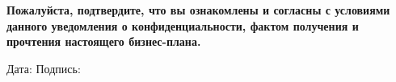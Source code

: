 \vspace{1cm} %

\noindent \textbf{Пожалуйста, подтвердите, что вы ознакомлены и согласны с условиями данного уведомления о конфиденциальности, фактом получения и прочтения настоящего бизнес-плана.}

\vfill %

Дата: \underline{\hspace{4cm}} \hfill Подпись: \underline{\hspace{4cm}}

